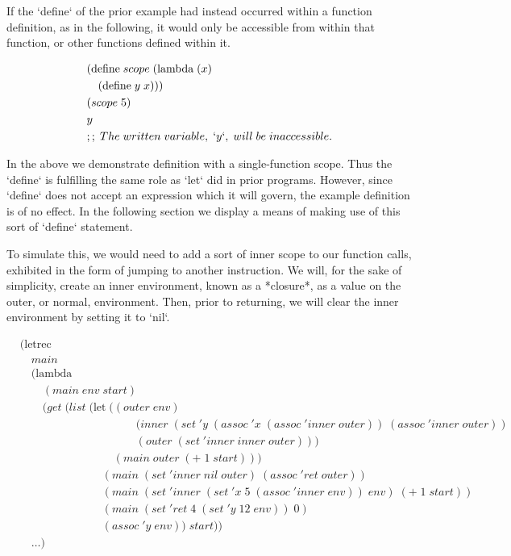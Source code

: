 If the `define` of the prior example had instead occurred within a function definition, 
as in the following, it would only be accessible from within that function, or other 
functions defined within it.

\begin{align*}
& (\text{define} \; scope \; (\text{lambda} \; (x)
\\& \quad (\text{define} \; y \; x)))
\\& (scope \; 5)
\\& y
\\& ;; \; The \; written \; variable, \; `y`, \; will \; be \; inaccessible.
\end{align*}

In the above we demonstrate definition with a single-function scope. Thus the 
`define` is fulfilling the same role as `let` did in prior programs. However, since 
`define` does not accept an expression which it will govern, the example definition 
is of no effect. In the following section we display a means of making use of this 
sort of `define` statement.

To simulate this, we would need to add a sort of inner scope to our function calls, 
exhibited in the form of jumping to another instruction. We will, for the sake of
simplicity, create an inner environment, known as a *closure*, as a value on the
outer, or normal, environment. Then, prior to returning, we will clear the inner 
environment by setting it to `nil`.

\begin{align*}
& (\text{letrec} \; 
\\& \quad main \; 
\\& \quad (\text{lambda} \; 
\\& \qquad (main \; env \; start)
\\& \qquad (get \; (list \; (\text{let} \; ((outer \; env)
\\& \qquad \qquad \qquad \qquad \qquad \; (inner \; (set \; 'y \; (assoc \; 'x \; (assoc \; 'inner \; outer)) \; (assoc \; 'inner \; outer))
\\& \qquad \qquad \qquad \qquad \qquad \; (outer \; (set \; 'inner \; inner \; outer)))
\\& \qquad \qquad \qquad \qquad \; (main \; outer \; (+ \; 1 \; start)))
\\& \qquad \qquad \qquad \quad \; (main \; (set \; 'inner \; nil \; outer) \; (assoc \; 'ret \; outer))
\\& \qquad \qquad \qquad \quad \; (main \; (set \; 'inner \; (set \; 'x \; 5 \; (assoc \; 'inner \; env)) \; env) \; (+ \; 1 \; start))
\\& \qquad \qquad \qquad \quad \; (main \; (set \; 'ret \; 4 \; (set \; 'y \; 12 \; env)) \; 0)
\\& \qquad \qquad \qquad \quad \; (assoc \; 'y \; env)) \; start))
\\& \quad \dots)
\end{align*}

